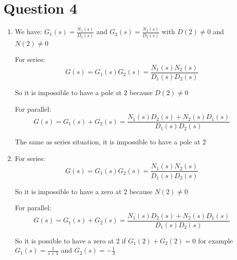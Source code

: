 \documentclass[12pt]{article}
\begin{document}
\section*{Question 4}
    \begin{enumerate}[label=(\alph*)]
        \item 
        We have: $G_1(s) = \frac{N_1(s)}{D_1(s)}$ and $G_2(s) = \frac{N_2(s)}{D_2(s)}$ with $D(2) \neq 0$ and $N(2) \neq 0$

        For series: \[G(s) = G_1(s)G_2(s) = \frac{N_1(s)N_2(s)}{D_1(s)D_2(s)}\]

        So it is impossible to have a pole at 2 because $D(2) \neq 0$

        For parallel: \[G(s) = G_1(s) + G_2(s) = \frac{N_1(s)D_2(s) +N_2(s)D_1(s)}{D_1(s)D_2(s)}\]

        The same as series situation, it is impossible to have a pole at 2

        \item 
        For series: \[G(s) = G_1(s)G_2(s) = \frac{N_1(s)N_2(s)}{D_1(s)D_2(s)}\]

        So it is impossible to have a zero at 2 because $N(2) \neq 0$

        For parallel: \[G(s) = G_1(s) + G_2(s) = \frac{N_1(s)D_2(s) +N_2(s)D_1(s)}{D_1(s)D_2(s)}\]

        So it is possible to have a zero at 2 if $G_1(2) + G_2(2) = 0$ for example $G_1(s) = \frac{1}{s+1}$ and $G_2(s) = -\frac{1}{3}$

    \end{enumerate}
\end{document}
